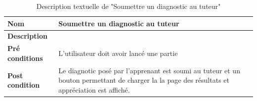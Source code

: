     \begin{table}[H]
        \centering
        \begin{tabular}{|p{}|p{}|}
            \hline
            \textbf{Nom} &  Soumettre un diagnostic au tuteur\\
            \hline
            \textbf{Description}& \\ 
            \hline
            \textbf{Pré conditions}& L'utilisateur doit avoir lancé une partie \\ 
            \hline
            \textbf{Post condition}& Le diagnotic posé par l'apprenant est soumi au tuteur et un bouton permettant de charger la la page des résultats et appréciation est affiché.\\
            \hline
        \end{tabular}
        \captionsetup{justification=centering}
        \caption{Description textuelle de "Soumettre un diagnostic au tuteur"}
        \label{tab:diagnostic_use_case}
    \end{table}
    
